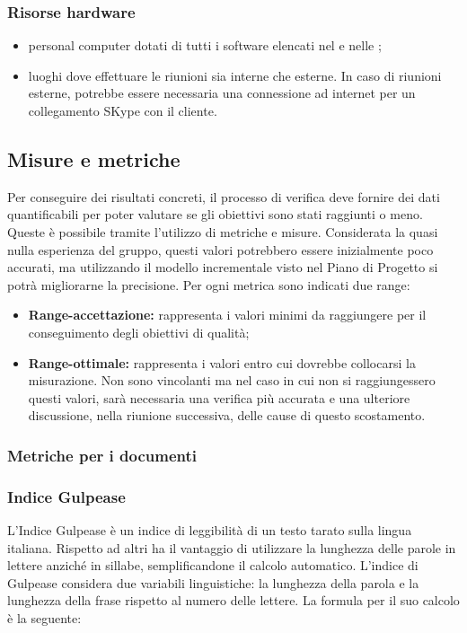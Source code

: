 		\subsubsection{Risorse hardware}
		\begin{itemize}
			\item personal computer dotati di tutti i software elencati nel \PdQ e nelle \NdP;
			\item luoghi dove effettuare le riunioni sia interne che esterne. In caso di riunioni esterne, potrebbe essere necessaria una connessione ad internet per un collegamento SKype con il cliente.
		\end{itemize}
		
						
	\subsection{Misure e metriche}
		Per conseguire dei risultati concreti, il processo di verifica deve fornire dei dati quantificabili per poter valutare se gli obiettivi sono stati raggiunti o meno. Queste è possibile tramite l’utilizzo di metriche e misure. Considerata la quasi nulla esperienza del gruppo, questi valori potrebbero essere inizialmente poco accurati, ma utilizzando il modello incrementale visto nel Piano di Progetto si potrà migliorarne la precisione.
		Per ogni metrica sono indicati due range:
		\begin{itemize}
			\item \textbf{Range-accettazione: }rappresenta i valori minimi da raggiungere per il conseguimento degli obiettivi di qualità;
			\item \textbf{Range-ottimale: }rappresenta i valori entro cui dovrebbe collocarsi la misurazione. Non sono vincolanti ma nel caso in cui non si raggiungessero questi valori, sarà necessaria una verifica più accurata e una ulteriore discussione, nella riunione successiva, delle cause di questo scostamento.
		\end{itemize}
	
		\subsubsection{Metriche per i documenti}
		
		\subsubsection{Indice Gulpease }
		L'Indice Gulpease è un indice di leggibilità di un testo tarato sulla lingua italiana. Rispetto ad altri ha il vantaggio di utilizzare la lunghezza delle parole in lettere anziché in sillabe, semplificandone il calcolo automatico.
		L'indice di Gulpease considera due variabili linguistiche: la lunghezza della parola e la lunghezza della frase rispetto al numero delle lettere.
		La formula per il suo calcolo è la seguente:
		
